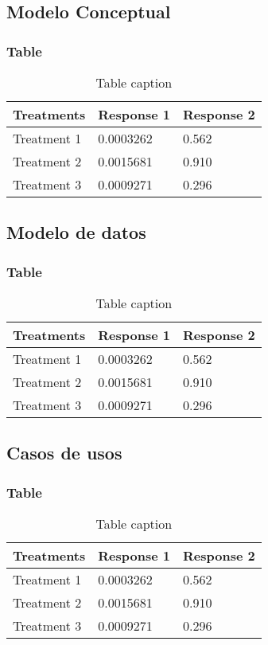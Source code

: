 \documentclass{beamer}
\begin{document}
\subsection{Modelo Conceptual} 
\begin{frame}
\frametitle{Table}
\begin{table}
\begin{tabular}{l l l}
\toprule
\textbf{Treatments} & \textbf{Response 1} & \textbf{Response 2}\\
\midrule
Treatment 1 & 0.0003262 & 0.562 \\
Treatment 2 & 0.0015681 & 0.910 \\
Treatment 3 & 0.0009271 & 0.296 \\
\bottomrule
\end{tabular}
\caption{Table caption}
\end{table}
\end{frame}


\subsection{Modelo de datos} 
\begin{frame}
\frametitle{Table}
\begin{table}
\begin{tabular}{l l l}
\toprule
\textbf{Treatments} & \textbf{Response 1} & \textbf{Response 2}\\
\midrule
Treatment 1 & 0.0003262 & 0.562 \\
Treatment 2 & 0.0015681 & 0.910 \\
Treatment 3 & 0.0009271 & 0.296 \\
\bottomrule
\end{tabular}
\caption{Table caption}
\end{table}
\end{frame}

\subsection{Casos de usos} 
\begin{frame}
\frametitle{Table}
\begin{table}
\begin{tabular}{l l l}
\toprule
\textbf{Treatments} & \textbf{Response 1} & \textbf{Response 2}\\
\midrule
Treatment 1 & 0.0003262 & 0.562 \\
Treatment 2 & 0.0015681 & 0.910 \\
Treatment 3 & 0.0009271 & 0.296 \\
\bottomrule
\end{tabular}
\caption{Table caption}
\end{table}
\end{frame}
\end{document}
